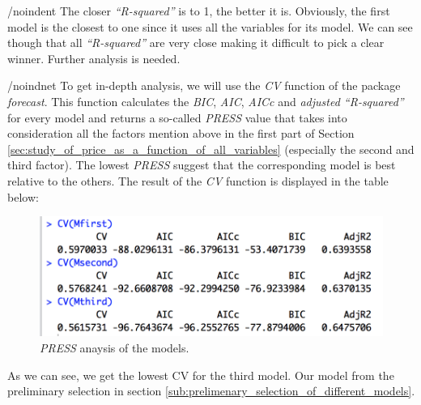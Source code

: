 /noindent
The closer \emph{``R-squared''} is to 1, the better it is. Obviously, the 
first model is the closest to one since it uses all the variables for its model. We can see though that all \emph{``R-squared''} are very close making it difficult to pick a clear winner. Further analysis is needed.

/noindnet
To get in-depth analysis, we will use the \textit{CV} function of the package \textit{forecast}. This function calculates the \emph{BIC}, \emph{AIC}, \emph{AICc} and \emph{adjusted ``R-squared''} for every model and returns 
a so-called \emph{PRESS} value that takes into consideration all the factors mention above in the first part of Section \ref{sec:study_of_price_as_a_function_of_all_variables} (especially the second and third factor). The lowest \emph{PRESS} suggest that the corresponding model is best relative to the others. The result of the \textit{CV} function is displayed in the table below:

\begin{figure}[H]
  \begin{center}
    \includegraphics[scale=0.7]{./img/CV_analysis.png}
    \end{center}
  \caption{\textit{PRESS} anaysis of the models.}
  \label{fig:PRESS}
\end{figure}

As we can see, we get the lowest CV for the third model. Our model from the preliminary selection in section \ref{sub:prelimenary_selection_of_different_models}.



